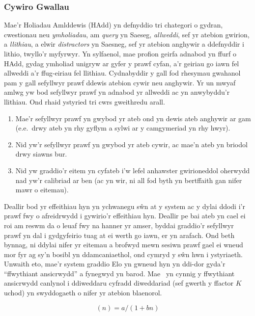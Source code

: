 \subsubsection{Cywiro Gwallau}
Mae'r Holiadau Amlddewis (HAdd) yn defnyddio tri chategori o gydran, cwestionau neu \textit{ymholiadau}, am \textit{query} yn Saeseg, \textit{allweddi}, sef yr atebion gwirion, a \textit{llithiau}, a elwir \textit{distractors} yn Saesneg, sef yr atebion anghywir a ddefnyddir i lithio, twyllo'r myfyrwyr. Yn sylfaenol, mae profion geirfa adnabod yn ffurf o HAdd, gydag ymholiad unigryw ar gyfer y prawf cyfan, a'r geiriau go iawn fel allweddi a'r ffug-eiriau fel llithiau. Cydnabyddir y gall fod rhesymau gwahanol pam y gall sefyllwyr prawf ddewis atebion cywir neu anghywir. Yr un mwyaf amlwg yw bod sefyllwyr prawf yn adnabod yr allweddi ac yn anwybyddu'r llithiau. Ond rhaid ystyried tri cwrs gweithredu arall.
\begin{enumerate}
    \item Mae'r sefyllwyr prawf yn gwybod yr ateb ond yn dewis ateb anghywir ar gam (e.e.\ drwy ateb yn rhy gyflym a sylwi ar y camgymeriad yn rhy hwyr).
    \item Nid yw'r sefyllwyr prawf yn gwybod yr ateb cywir, ac mae'n ateb yn briodol drwy siawns bur.
    \item Nid yw graddio'r eitem yn cyfateb i'w lefel anhawster gwirioneddol oherwydd nad yw'r calibriad ar ben (ac yn wir, ni all fod byth yn bertffaith gan nifer mawr o eitemau).
\end{enumerate}
Deallir bod yr effeithiau hyn yn ychwanegu sŵn at y system ac y dylai ddodi i'r prawf fwy o afreidrwydd i gywirio'r effeithiau hyn. Deallir pe bai ateb yn cael ei roi am reswm da o leuaf fwy na hanner yr amser, byddai graddio'r sefyllwyr prawf yn dal i gydgyfeirio tuag at ei werth go iawn, er yn arafach. Ond beth bynnag, ni ddylai nifer yr eitemau a brofwyd mewn sesiwn prawf gael ei wneud mor fyr ag sy'n bosibl yn ddamcaniaethol, ond cymryd y sŵn hwn i ystyriaeth. Unwaith eto, mae'r system graddio Elo yn gwneud hyn yn ddi-dor gyda'r ``ffwythiant ansicrwydd'' a fynegwyd yn barod. Mae~\cite{pelanek_applications_2016} yn cynnig y ffwythiant ansicrwydd canlynol i ddiweddaru cyfradd diweddariad (sef gwerth y ffactor $K$ uchod) yn swyddogaeth o nifer yr atebion blaenorol.

\begin{equation}
    (n)=a/(1 + bn)
\end{equation}\label{eq:uncertainty-function}

